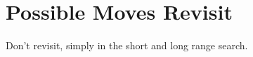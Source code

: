 \section*{Possible Moves Revisit}

Don't revisit, simply in the short and long range search.
% 
% 
%
% 
%
% 
%
% 
%
% 
